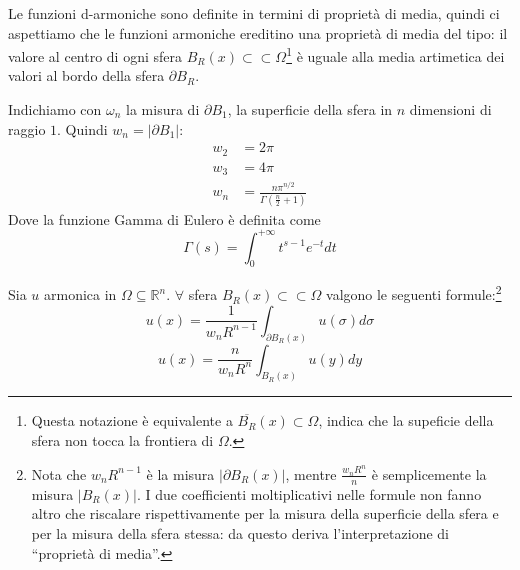 \documentclass[10pt,a4paper,twoside,openright]{book}
\begin{document}
Le funzioni d-armoniche sono definite in termini di proprietà di media, quindi ci aspettiamo che le funzioni armoniche ereditino una proprietà di media del tipo: il valore al centro di ogni sfera $\displaystyle B_{R}(x) \subset \subset \Omega $\footnote{Questa notazione è equivalente a $\displaystyle \overline{B_{R}}(x) \subset \Omega $, indica che la supeficie della sfera non tocca la frontiera di $\displaystyle \Omega $.} è uguale alla media artimetica dei valori al bordo della sfera $\displaystyle \partial B_{R}$.

Indichiamo con $\displaystyle \omega _{n}$ la misura di $\displaystyle \partial B_{1}$, la superficie della sfera in $\displaystyle n$ dimensioni di raggio $\displaystyle 1$. Quindi $\displaystyle w_{n} =| \partial B_{1}| $:
\begin{align*}
	w_{2} & =2\pi                                                   \\
	w_{3} & =4\pi                                                   \\
	w_{n} & =\frac{n\pi ^{n/2}}{\Gamma \left(\frac{n}{2} +1\right)} 
\end{align*}
Dove la funzione Gamma di Eulero è definita come
\begin{equation*}
	\Gamma (s) =\int ^{+\infty }_{0} t^{s-1} e^{-t} dt
\end{equation*}
\begin{theorem}
	Sia $\displaystyle u$ armonica in $\displaystyle \Omega \subseteq \mathbb{R}^{n}$. $\displaystyle \forall $ sfera $\displaystyle B_{R}(x) \subset \subset \Omega $ valgono le seguenti formule:\footnote{Nota che $\displaystyle w_{n} R^{n-1}$ è la misura $\displaystyle | \partial B_{R}(x)| $, mentre $\displaystyle \frac{w_{n} R^{n}}{n}$ è semplicemente la misura $\displaystyle | B_{R}(x)| $. I due coefficienti moltiplicativi nelle formule non fanno altro che riscalare rispettivamente per la misura della superficie della sfera e per la misura della sfera stessa: da questo deriva l'interpretazione di ``proprietà di media''.}
	\begin{equation}
		u(x) =\frac{1}{w_{n} R^{n-1}}\int _{\partial B_{R}(x)} u(\sigma) d\sigma 
		\label{eq:lap-prop-media-i}
	\end{equation}
	\begin{equation}
		u(x) =\frac{n}{w_{n} R^{n}}\int _{B_{R}(x)} u(y) dy
		\label{eq:lap-prop-media-ii}
	\end{equation}
\end{theorem}
\end{document}
